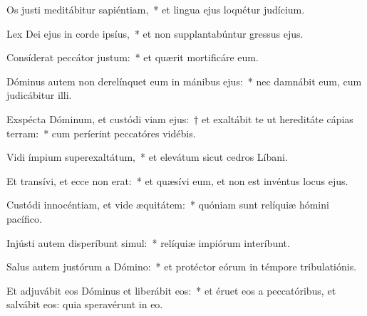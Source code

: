 
\item Os justi meditábitur sapiéntiam,~* et lingua ejus loquétur judícium.

\item Lex Dei ejus in corde ipsíus,~* et non supplantabúntur gressus ejus.

\item Consíderat peccátor justum:~* et quærit mortificáre eum.

\item Dóminus autem non derelínquet eum in mánibus ejus:~* nec damnábit eum, cum judicábitur illi.

\item Exspécta Dóminum, et custódi viam ejus:~† et exaltábit te ut hereditáte cápias terram:~* cum períerint peccatóres vidébis.

\item Vidi ímpium superexaltátum,~* et elevátum sicut cedros Líbani.

\item Et transívi, et ecce non erat:~* et quæsívi eum, et non est invéntus locus ejus.

\item Custódi innocéntiam, et vide æquitátem:~* quóniam sunt relíquiæ hómini pacífico.

\item Injústi autem disperíbunt simul:~* relíquiæ impiórum interíbunt.

\item Salus autem justórum a Dómino:~* et protéctor eórum in témpore tribulatiónis.

\item Et adjuvábit eos Dóminus et liberábit eos:~* et éruet eos a peccatóribus, et salvábit eos: quia speravérunt in eo.